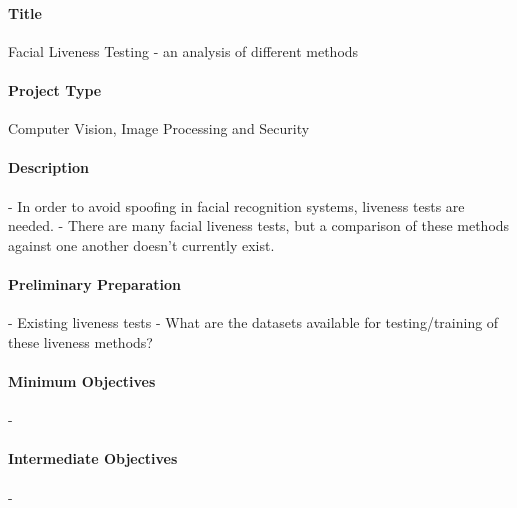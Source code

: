 \documentclass{article}
\begin{document}
    
    \paragraph{Title}
        Facial Liveness Testing - an analysis of different methods
    \paragraph{Project Type}
        Computer Vision, Image Processing and Security
    \paragraph{Description}
        - In order to avoid spoofing in facial recognition systems, liveness tests are needed.
        - There are many facial liveness tests, but a comparison of these methods against one another doesn't currently exist.
    \paragraph{Preliminary Preparation}
        \begin{itemize}
            - Existing liveness tests
            - What are the datasets available for testing/training of these liveness methods?
        \end{itemize}
    \paragraph{Minimum Objectives}
        \begin{itemize}
            - 
        \end{itemize}
    \paragraph{Intermediate Objectives}
        \begin{itemize}
          - 
        \end{itemize}
\end{document}
